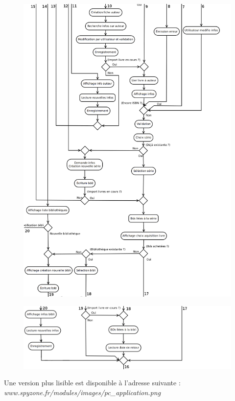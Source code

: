 \begin{figure}[h!]
\begin{center}
\includegraphics[width=16cm]{uml/appli_pc/p3.png}
\end{center}
\end{figure}
\newpage{}

\begin{figure}[t!]
\begin{center}
\includegraphics[width=16cm]{uml/appli_pc/p4.png}
\end{center}
\end{figure}

Une version plus lisible est disponible à l'adresse suivante : 
\emph{www.spyzone.fr/modules/images/pc\_application.png}

